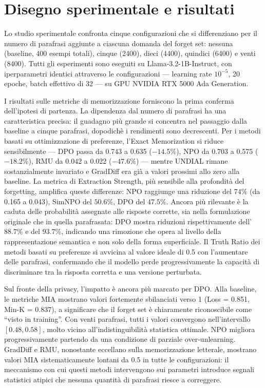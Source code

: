 \documentclass[12pt,a4paper]{article}
\begin{document}
\section{Disegno sperimentale e risultati}

Lo studio sperimentale confronta cinque configurazioni che si differenziano per il numero di parafrasi aggiunte a ciascuna domanda del forget set: nessuna (baseline, 400 esempi totali), cinque (2400), dieci (4400), quindici (6400) e venti (8400). Tutti gli esperimenti sono eseguiti su Llama-3.2-1B-Instruct, con iperparametri identici attraverso le configurazioni — learning rate $10^{-5}$, 20 epoche, batch effettivo di 32 — su GPU NVIDIA RTX 5000 Ada Generation.

I risultati sulle metriche di memorizzazione forniscono la prima conferma dell'ipotesi di partenza. La dipendenza dal numero di parafrasi ha una caratteristica precisa: il guadagno più grande si concentra nel passaggio dalla baseline a cinque parafrasi, dopodichè i rendimenti sono decrescenti. Per i metodi basati su ottimizzazione di preferenze, l'Exact Memorization si riduce sensibilmente — DPO passa da 0.743 a 0.635 ($-14.5\%$), NPO da 0.703 a 0.575 ($-18.2\%$), RMU da 0.042 a 0.022 ($-47.6\%$) — mentre UNDIAL rimane sostanzialmente invariato e GradDiff era già a valori prossimi allo zero alla baseline. La metrica di Extraction Strength, più sensibile alla profondità del forgetting, amplifica queste differenze: NPO raggiunge una riduzione del $74\%$ (da 0.165 a 0.043), SimNPO del $50.6\%$, DPO del $47.5\%$. Ancora più rilevante è la caduta delle probabilità assegnate alle risposte corrette, sia nella formulazione originale che in quella parafrasata: DPO mostra riduzioni rispettivamente dell'$88.7\%$ e del $93.7\%$, indicando una rimozione che opera al livello della rappresentazione semantica e non solo della forma superficiale. Il Truth Ratio dei metodi basati su preferenze si avvicina al valore ideale di 0.5 con l'aumentare delle parafrasi, confermando che il modello perde progressivamente la capacità di discriminare tra la risposta corretta e una versione perturbata.

Sul fronte della privacy, l'impatto è ancora più marcato per DPO. Alla baseline, le metriche MIA mostrano valori fortemente sbilanciati verso 1 (Loss = 0.851, Min-K = 0.837), a significare che il forget set è chiaramente riconoscibile come ``visto in training''. Con venti parafrasi, tutti i valori convergono nell'intervallo $[0.48, 0.58]$, molto vicino all'indistinguibilità statistica ottimale. NPO migliora progressivamente partendo da una condizione di parziale over-unlearning. GradDiff e RMU, nonostante eccellano sulla memorizzazione letterale, mostrano valori MIA sistematicamente lontani da 0.5 in tutte le configurazioni: il meccanismo con cui questi metodi intervengono sui parametri introduce segnali statistici atipici che nessuna quantità di parafrasi riesce a correggere.
\end{document}
